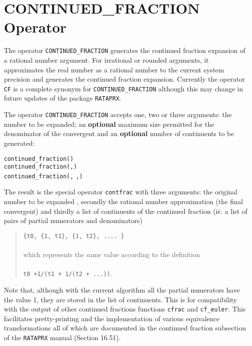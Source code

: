 \section{CONTINUED\_FRACTION Operator}
\hypertarget{operator:CONTINUED_FRACTION}{}

The operator \texttt{CONTINUED\_FRACTION}
generates the continued fraction expansion of a rational number argument.
For irrational or rounded arguments, it approximates the real number
as a rational number to the current system precision and generates
the continued fraction expansion. Currently the operator \texttt{CF} is a
complete synonym for \texttt{CONTINUED\_FRACTION} although this may change
in future updates of the package \texttt{RATAPRX}. 

The operator \texttt{CONTINUED\_FRACTION} accepts one, two or
three arguments: the number to be expanded; an \textbf{optional} maximum size
permitted for the denominator of the convergent
and an \textbf{optional} number of continuents to be generated:
\begin{syntaxtable}
  \texttt{continued\_fraction(}\texttt{)}\\
  \texttt{continued\_fraction(}\texttt{,}\texttt{)} \\
  \texttt{continued\_fraction(}\texttt{,}
  \texttt{,}\texttt{)}
\end{syntaxtable}
The result is the special operator \texttt{contfrac}
with three arguments: the original number to be expanded
, secondly the rational number approximation (the final convergent)
and thirdly a list of continuents of the continued fraction (i\.e. a list of
pairs of partial numerators and denominators)
\begin{quote}
\begin{tabbing}
\hspace{10mm} \= \texttt{\{t0, \{1, t1\}, \{1, t2\}, .... \}}\\ \\
which represents the same value according to the definition\\ \\
 \> \texttt{t0 +1/(t1 + 1/(t2 + ...))}.
\end{tabbing}
\end{quote}
Note that, although with the current
algorithm all the partial numerators have the value 1, they are stored
in the list of continuents. This is for compatibility with the output of
other continued fractions functions \texttt{cfrac} and \texttt{cf\_euler}.
This facilitates pretty-printing and the implementation of various equivalence
transformations all of which are documented in the continued fraction
subsection of the \texttt{RATAPRX} manual (Section 16.51).

